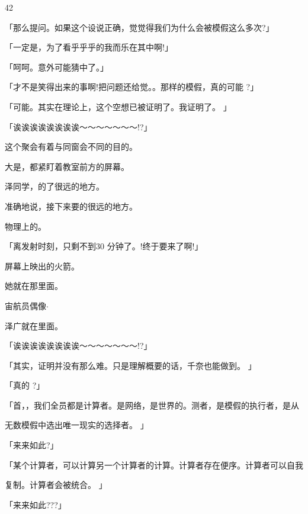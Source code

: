 42\par
「那么提问。如果这个设说正确，觉觉得我们为什么会被模假这么多次?」\par
「一定是，为了看乎乎乎的我而乐在其中啊!」\par
「呵呵。意外可能猜中了。」\par
「才不是笑得出来的事啊!把问题还给觉。。那样的模假，真的可能 ?」\par
「可能。其实在理论上，这个空想已被证明了。我证明了。 」\par
「诶诶诶诶诶诶诶诶～～～～～～～!?」\par
这个聚会有着与同窗会不同的目的。\par
大是，都紧盯着教室前方的屏幕。\par
泽同学，的了很远的地方。\par
准确地说，接下来要的很远的地方。\par
物理上的。\par
「离发射时刻，只剩不到30 分钟了。!终于要来了啊!」\par
屏幕上映出的火箭。\par
她就在那里面。\par
宙航员偶像$\cdot$\par
泽广就在里面。\par
「诶诶诶诶诶诶诶诶～～～～～～～!?」\par
「其实，证明并没有那么难。只是理解概要的话，千奈也能做到。 」\par
「真的 ?」\par
「首，，我们全员都是计算者。是网络，是世界的。测者，是模假的执行者，是从\par
无数模假中选出唯一现实的选择者。 」\par
「来来如此?」\par
「某个计算者，可以计算另一个计算者的计算。计算者存在便序。计算者可以自我\par
复制。计算者会被统合。 」\par
「来来如此???」\par

